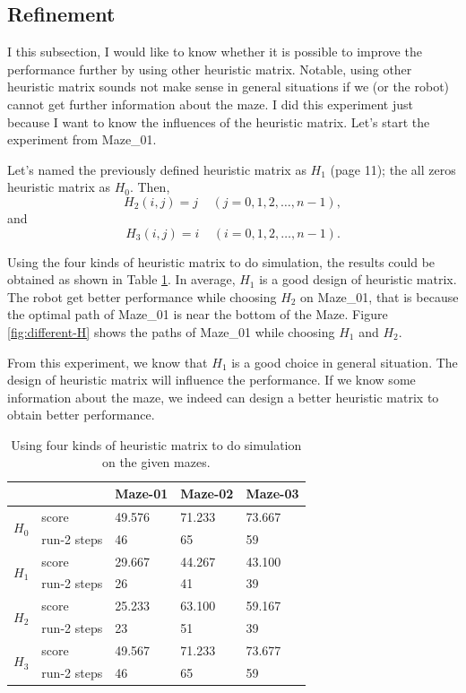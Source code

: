 \documentclass[11pt, oneside]{article}   	%
\begin{document}
\subsection{Refinement}
I this subsection, I would like to know whether it is possible to improve the performance further by using other heuristic matrix. Notable, using other heuristic matrix sounds not make sense in general situations if we (or the robot) cannot get further information about the maze. I did this experiment just because I want to know the influences of the heuristic matrix. Let's start the experiment from Maze\_01.

Let's named the previously defined heuristic matrix as $H_1$ (page 11); the all zeros heuristic matrix as $H_0$. Then,
\[
H_2(i,j) = j\ \ \ \ \ (j=0,1,2,\ldots , n-1),
\]
and
\[
H_3(i,j) = i\ \ \ \ \ (i=0,1,2,\ldots , n-1).
\]

Using the four kinds of heuristic matrix to do simulation, the results could be obtained as shown in Table \ref{tab:4-heuristic}. In average, $H_1$ is a good design of heuristic matrix. The robot get better performance while choosing $H_2$ on Maze\_01, that is because the optimal path of Maze\_01 is near the bottom of the Maze. Figure \ref{fig:different-H} shows the paths of Maze\_01 while choosing $H_1$ and $H_2$.

From this experiment, we know that $H_1$ is a good choice in general situation. The design of heuristic matrix will influence the performance. If we know some information about the maze, we indeed can design a better heuristic matrix to obtain better performance.


\begin{table}[]
\centering
\caption{Using four kinds of heuristic matrix to do simulation on the given mazes.}
\label{tab:4-heuristic}
\begin{tabular}{lllll}
\hline
                      &             & Maze-01 & Maze-02 & Maze-03 \\ \hline
\multirow{2}{*}{$H_0$} & score       & 49.576  & 71.233  & 73.667  \\ 
                      & run-2 steps & 46      & 65      & 59      \\ \hline
\multirow{2}{*}{$H_1$} & score       & 29.667  & 44.267  & 43.100  \\ 
                      & run-2 steps & 26      & 41      & 39      \\ \hline
\multirow{2}{*}{$H_2$} & score       & 25.233  & 63.100  & 59.167  \\
                      & run-2 steps & 23      & 51      & 39      \\ \hline
\multirow{2}{*}{$H_3$} & score       & 49.567  & 71.233  & 73.677  \\
                      & run-2 steps & 46      & 65      & 59      \\ \hline
\end{tabular}
\end{table}
\end{document}
